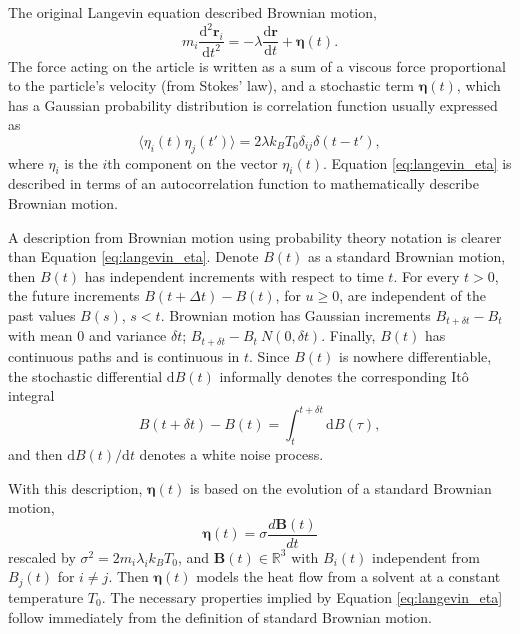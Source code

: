 The original Langevin equation\cite{langevin1908_equation} described Brownian motion,
\begin{equation}
  \label{eq:langevin}
  m_i \frac{\mathrm{d}^2 \bm{r}_i}
	         {\mathrm{d} t^2}
  =
  - \lambda
	  \frac{\mathrm{d} \bm{r}}
	       {\mathrm{d} t}
	+ \bm{\eta}(t).
\end{equation}
The force acting on the article is written as a sum of a viscous force proportional to the particle's velocity (from Stokes' law), and a stochastic term $\bm{\eta}(t)$, which has a Gaussian probability distribution is correlation function usually expressed as
\begin{equation}
  \label{eq:langevin_eta}
  \langle \eta_i(t) \eta_j(t') \rangle = 2 \lambda k_B T_0 \delta_{ij} \delta(t-t'),
\end{equation}
where $\eta_i$ is the $i$th component on the vector $\eta_i(t)$.  Equation \ref{eq:langevin_eta} is described in terms of an autocorrelation function to mathematically describe Brownian motion.

A description from Brownian motion using probability theory notation\cite{karatzas1991_sde} is clearer than Equation \ref{eq:langevin_eta}. Denote $B(t)$ as a standard Brownian motion, then $B(t)$ has independent increments with respect to time $t$.  For every $t > 0$, the future increments $B(t+\Delta t) - B(t)$, for $u \geq 0$, are independent of the past values $B(s)$, $s < t$.  Brownian motion has Gaussian increments $B_{t+\delta t}-B_{t}$ with mean $0$ and variance $\delta t$; $B_{t+\delta t}-B_{t}~N(0,\delta t)$.
Finally, $B(t)$ has continuous paths and is continuous in $t$.
Since $B(t)$ is nowhere differentiable, the stochastic differential $\mathrm{d}B(t)$ informally denotes the corresponding It\^{o} integral
\begin{equation}
  B(t+\delta t) - B(t)
	=
	\int_t^{t+\delta{t}} \!\!\! \mathrm{d}B(\tau),
\end{equation}
and then $\mathrm{d} B(t)/\mathrm{d}t$ denotes a white noise process.

With this description, $\bm{\eta}(t)$ is based on the evolution of a standard Brownian motion,
\begin{equation}
  \bm{\eta}(t) = \sigma \frac{d\bm{B}(t)}{dt}
\end{equation}
rescaled by $\sigma^2 = 2 m_i \lambda_i k_B T_0$, and $\bm{B}(t) \in \mathbb{R}^3$ with $B_i(t)$ independent from $B_j(t)$ for $i \neq j$.  Then $\bm{\eta}(t)$ models the heat flow from a solvent at a constant temperature $T_0$.  The necessary properties implied by Equation \ref{eq:langevin_eta} follow immediately from the definition of standard Brownian motion.

